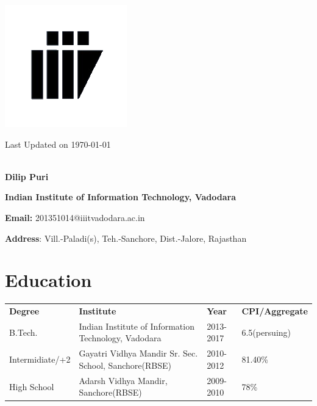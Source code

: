 \documentclass{article}
\begin{document}

\begin{minipage}{.1\textwidth}
\includegraphics[scale=0.6]{logo_iiitv.png}
\end{minipage}%
\begin{minipage}{1.5\textwidth}
\hspace*{12cm}Last Updated on \today \\ \\
\begin{large}
\hspace*{4cm}\textbf{Dilip Puri}\vspace*{2mm}

\hspace*{4cm}\textbf{Indian Institute of Information Technology, Vadodara}\vspace*{2mm}

\hspace*{4cm}\textbf{Email:} 201351014@iiitvadodara.ac.in\vspace*{2mm}

\hspace*{4cm}\textbf{Address}: Vill.-Paladi(s), Teh.-Sanchore, Dist.-Jalore, Rajasthan
\end{large}    
\end{minipage}

\section{Education}
\begin{tabular}{llll}
\textbf{Degree}&\textbf{Institute}&\textbf{Year}&\textbf{CPI/Aggregate}\vspace*{1mm} \\
B.Tech.& Indian Institute of Information Technology, Vadodara & 2013-2017 & 6.5(persuing)\\
Intermidiate/+2 & Gayatri Vidhya Mandir Sr. Sec. School, Sanchore(RBSE) & 2010-2012 & 81.40\%\\
High School & Adarsh Vidhya Mandir, Sanchore(RBSE) & 2009-2010 & 78\%\\
\end{tabular}
\end{document}
